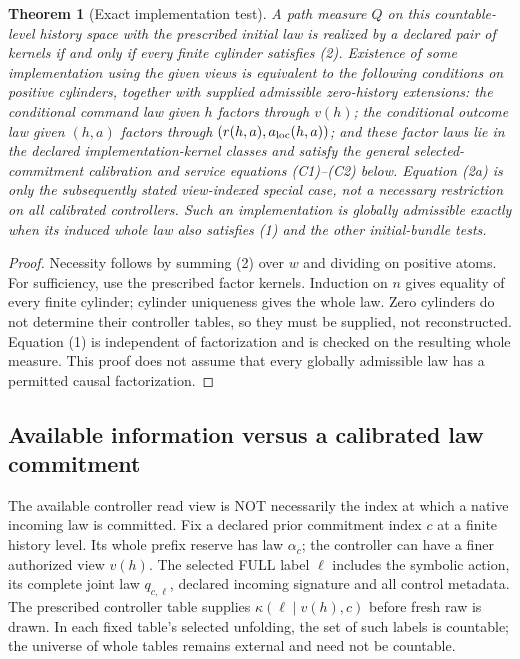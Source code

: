 \documentclass{article}
\newtheorem{theorem}{Theorem}\newtheorem{proposition}{Proposition}
\begin{document}
\begin{theorem}[Exact implementation test]
A path measure $Q$ on this countable-level history space with the prescribed initial law is realized by a declared pair of kernels if and only if every finite cylinder satisfies (2). Existence of some implementation using the given views is equivalent to the following conditions on positive cylinders, together with supplied admissible zero-history extensions: the conditional command law given $h$ factors through $v(h)$; the conditional outcome law given $(h,a)$ factors through $(r(h,a),a_{\rm loc}(h,a))$; and these factor laws lie in the declared implementation-kernel classes and satisfy the general selected-commitment calibration and service equations (C1)--(C2) below. Equation (2a) is only the subsequently stated view-indexed special case, not a necessary restriction on all calibrated controllers. Such an implementation is globally admissible exactly when its induced whole law also satisfies (1) and the other initial-bundle tests.
\end{theorem}
\begin{proof}
Necessity follows by summing (2) over $w$ and dividing on positive atoms. For sufficiency, use the prescribed factor kernels. Induction on $n$ gives equality of every finite cylinder; cylinder uniqueness gives the whole law. Zero cylinders do not determine their controller tables, so they must be supplied, not reconstructed. Equation (1) is independent of factorization and is checked on the resulting whole measure. This proof does not assume that every globally admissible law has a permitted causal factorization.
\end{proof}


\subsection{Available information versus a calibrated law commitment}
The available controller read view is NOT necessarily the index at which a native incoming law is committed. Fix a declared prior commitment index $c$ at a finite history level. Its whole prefix reserve has law $\alpha_c$; the controller can have a finer authorized view $v(h)$. The selected FULL label $\ell$ includes the symbolic action, its complete joint law $q_{c,\ell}$, declared incoming signature and all control metadata. The prescribed controller table supplies $\kappa(\ell\mid v(h),c)$ before fresh raw is drawn. In each fixed table's selected unfolding, the set of such labels is countable; the universe of whole tables remains external and need not be countable.
\end{document}
